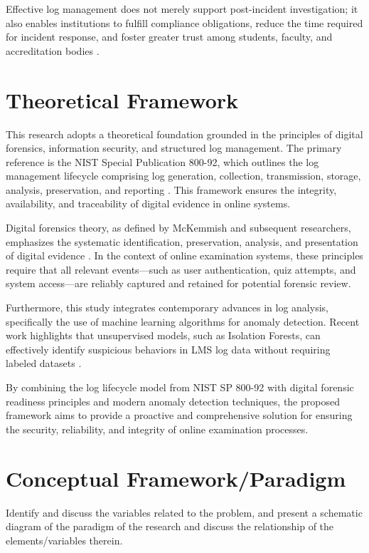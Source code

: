 Effective log management does not merely support post-incident investigation; it also enables institutions to fulfill compliance obligations, reduce the time required for incident response, and foster greater trust among students, faculty, and accreditation bodies \cite{rivera2019towards, abd2024enhancing}.
\section{Theoretical Framework}

This research adopts a theoretical foundation grounded in the principles of digital forensics, information security, and structured log management. The primary reference is the NIST Special Publication 800-92, which outlines the log management lifecycle comprising log generation, collection, transmission, storage, analysis, preservation, and reporting \cite{nist80092}. This framework ensures the integrity, availability, and traceability of digital evidence in online systems.

Digital forensics theory, as defined by McKemmish and subsequent researchers, emphasizes the systematic identification, preservation, analysis, and presentation of digital evidence \cite{mckemmish1999}. In the context of online examination systems, these principles require that all relevant events—such as user authentication, quiz attempts, and system access—are reliably captured and retained for potential forensic review.

Furthermore, this study integrates contemporary advances in log analysis, specifically the use of machine learning algorithms for anomaly detection. Recent work highlights that unsupervised models, such as Isolation Forests, can effectively identify suspicious behaviors in LMS log data without requiring labeled datasets \cite{garg2023preserving, lintang2024log}.

By combining the log lifecycle model from NIST SP 800-92 with digital forensic readiness principles and modern anomaly detection techniques, the proposed framework aims to provide a proactive and comprehensive solution for ensuring the security, reliability, and integrity of online examination processes.

\section{Conceptual Framework/Paradigm}

Identify and discuss the variables related to the problem, and present a schematic diagram of the paradigm of the research and discuss the relationship of the elements/variables therein.

